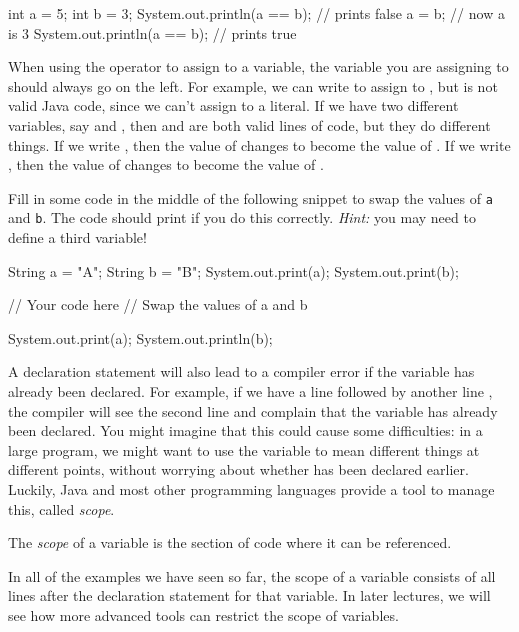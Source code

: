 \begin{code}
  int a = 5;
  int b = 3;
  System.out.println(a == b);   // prints false
  a = b;                        // now a is 3
  System.out.println(a == b);   // prints true
\end{code}

When using the \ic{=} operator to assign to a variable, the variable you are assigning to should always go on the left. For example, we can write  to assign  to , but  is not valid Java code, since we can't assign to a literal. If we have two different variables, say  and , then  and  are both valid lines of code, but they do different things. If we write , then the value of  changes to become the value of . If we write , then the value of  changes to become the value of .

\begin{exercise}
  Fill in some code in the middle of the following snippet to swap the values of \texttt{a} and \texttt{b}. The code should print  if you do this correctly. \emph{Hint:} you may need to define a third variable!
  \begin{code}
    String a = "A";
    String b = "B";
    System.out.print(a);
    System.out.print(b);

    // Your code here
    // Swap the values of a and b

    System.out.print(a);
    System.out.println(b);
  \end{code}
\end{exercise}

A declaration statement will also lead to a compiler error if the variable has already been declared. For example, if we have a line  followed by another line , the compiler will see the second line and complain that the variable  has already been declared. You might imagine that this could cause some difficulties: in a large program, we might want to use the variable  to mean different things at different points, without worrying about whether  has been declared earlier. Luckily, Java and most other programming languages provide a tool to manage this, called \emph{scope}.
\begin{definition}
  The \emph{scope} of a variable is the section of code where it can be referenced.
\end{definition}
In all of the examples we have seen so far, the scope of a variable consists of all lines after the declaration statement for that variable. In later lectures, we will see how more advanced tools can restrict the scope of variables.

